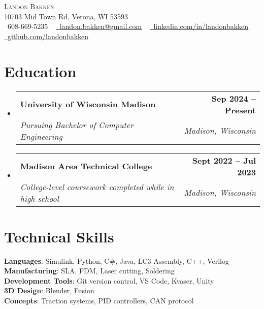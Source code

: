 \documentclass[letterpaper,11pt]{article}
\makeatletter
\newcommand{\resumeSubheading}[4]{
  \vspace{-2pt}\item
    \begin{tabular*}{1.0\textwidth}[t]{l@{\extracolsep{\fill}}r}
      \textbf{#1} & \textbf{\small #2} \\
      \textit{\small#3} & \textit{\small #4} \\
    \end{tabular*}\vspace{-7pt}
}
\newcommand{\resumeSubHeadingListStart}{\begin{itemize}[leftmargin=0.0in, label={}]}
\newcommand{\resumeSubHeadingListEnd}{\end{itemize}}
\makeatother
\begin{document}

\begin{center}
    {\Huge \scshape Landon Bakken} \\ \vspace{1pt}
    10703 Mid Town Rd, Verona, WI 53593 \\ \vspace{1pt}
    \small \raisebox{-0.1\height}\faPhone\ 608-669-5235 ~ \href{mailto:x@gmail.com}{\raisebox{-0.2\height}\faEnvelope\  \underline{landon.bakken@gmail.com}} ~ 
    \href{https://linkedin.com/in//}{\raisebox{-0.2\height}\faLinkedin\ \underline{linkedin.com/in/landonbakken}}  ~
    \href{https://github.com/}{\raisebox{-0.2\height}\faGithub\ \underline{github.com/landonbakken}}
    \vspace{-8pt}
\end{center}


\section{Education}
  \resumeSubHeadingListStart
    \resumeSubheading
      {University of Wisconsin Madison}{Sep 2024 -- Present}
      {Pursuing Bachelor of Computer Engineering}{Madison, Wisconsin}
    \resumeSubheading
      {Madison Area Technical College}{Sept 2022 -- Jul 2023}
      {College-level coursework completed while in high school}{Madison, Wisconsin}
  \resumeSubHeadingListEnd
\vspace{-5pt}


\section{Technical Skills}
 \begin{itemize}[leftmargin=0.15in, label={}]
    \small{\item{
     \textbf{Languages}{: Simulink, Python, C\#, Java, LC3 Assembly, C++, Verilog} \\
     \textbf{Manufacturing}{: SLA, FDM, Laser cutting, Soldering} \\
     \textbf{Development Tools}{: Git version control, VS Code, Kvaser, Unity} \\
     \textbf{3D Design}{: Blender, Fusion} \\
     \textbf{Concepts}{: Traction systems, PID controllers, CAN protocol} }}
 \end{itemize}
 \vspace{-15pt}
\end{document}
